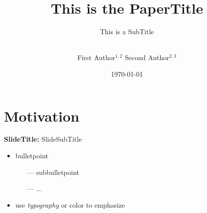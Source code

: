 \documentclass{beamer} %
\title{\textbf{This is the PaperTitle}}
\subtitle{This is a SubTitle}
\author{\\
		\small{First Author}{\scriptsize$^{1,2}$}\quad
		\small{Second Author}{\scriptsize$^{2,3}$}}
\institute{{\tiny$^{1}$}Affiliation 1\quad
		   {\tiny$^{2}$}Affiliation 2\quad
		   {\tiny$^{3}$}Affiliation 3}
\date{\footnotesize \today}
\begin{document}
{
\frame[plain]{\titlepage}
\addtocounter{framenumber}{-1}
}

\frame[plain]{\titlepage}
\addtocounter{framenumber}{-1}




\section{Motivation}

\begin{frame}{\textbf{SlideTitle:} SlideSubTitle}
	\begin{itemize}
	    \item bulletpoint
    	\begin{itemize}
    	    \item[---] subbulletpoint
    	    \item[---] ...
    	\end{itemize}
    	\item use \emph{typography} or \textcolor{lmu-green}{color} to emphasize
	\end{itemize}
\end{frame}
\end{document}
